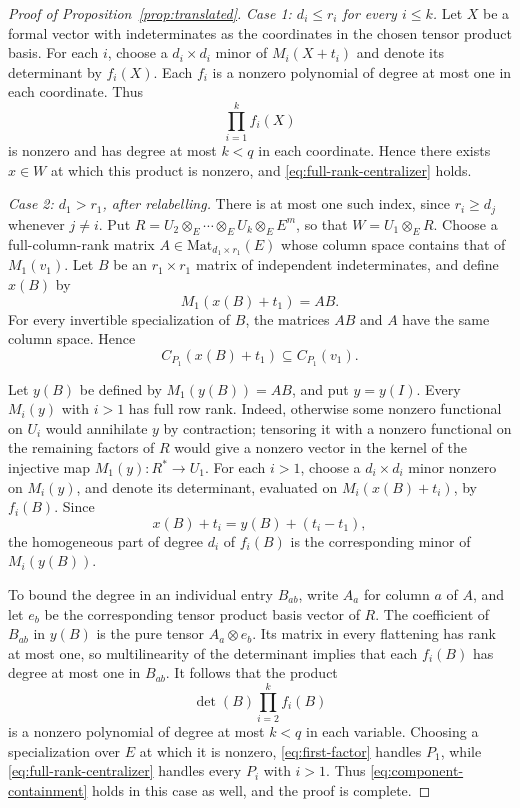 \documentclass[11pt]{amsart}
\numberwithin{equation}{section}
\theoremstyle{definition}
\theoremstyle{remark}
\begin{document}
\begin{proof}[Proof of Proposition~\ref{prop:translated}]
\smallskip
\noindent\emph{Case 1: $d_i \leqslant r_i$ for every $i \leqslant k$.}
Let $X$ be a formal vector with indeterminates as the coordinates in the chosen tensor product basis.
For each $i$, choose a $d_i \times d_i$ minor of $M_i(X+t_i)$ and denote its determinant by $f_i(X)$.
Each $f_i$ is a nonzero polynomial of degree at most one in each coordinate.
Thus
\[
    \prod_{i=1}^k f_i(X)
\]
is nonzero and has degree at most $k<q$ in each coordinate.
Hence there exists $x\in W$ at which this product is nonzero,
and \eqref{eq:full-rank-centralizer} holds.

\smallskip
\noindent\emph{Case 2: $d_1>r_1$, after relabelling.}
There is at most one such index, since $r_i \geqslant d_j$ whenever $j\ne i$.
Put $R=U_2\otimes_E\cdots\otimes_E U_k\otimes_E E^m$, so that $W=U_1\otimes_E R$.
Choose a full-column-rank matrix
$A\in\mathrm{Mat}_{d_1\times r_1}(E)$ whose column space contains that of
$M_1(v_1)$. Let $B$ be an $r_1\times r_1$ matrix of independent
indeterminates, and define $x(B)$ by
\[
    M_1(x(B)+t_1)=AB.
\]
For every invertible specialization of $B$, the matrices $AB$ and
$A$ have the same column space. Hence
\begin{equation}\label{eq:first-factor}
    C_{P_1}(x(B)+t_1) \subseteq C_{P_1}(v_1).
\end{equation}

Let $y(B)$ be defined by $M_1(y(B))=AB$, and put $y=y(I)$.
Every $M_i(y)$ with $i>1$ has full row rank.
Indeed, otherwise some nonzero functional on $U_i$ would annihilate $y$ by contraction;
tensoring it with a nonzero functional on the remaining factors of $R$
would give a nonzero vector in the kernel
of the injective map $M_1(y) \colon R^* \to U_1$.
For each $i>1$, choose a $d_i\times d_i$ minor nonzero on $M_i(y)$,
and denote its determinant, evaluated on $M_i(x(B)+t_i)$, by $f_i(B)$.
Since
\[
    x(B)+t_i=y(B)+(t_i-t_1),
\]
the homogeneous part of degree $d_i$ of $f_i(B)$ is the corresponding minor of $M_i(y(B))$.

To bound the degree in an individual entry $B_{ab}$, write $A_a$ for column $a$ of $A$,
and let $e_b$ be the corresponding tensor product basis vector of $R$.
The coefficient of $B_{ab}$ in $y(B)$ is the pure tensor $A_a\otimes e_b$.
Its matrix in every flattening has rank at most one, so multilinearity of the determinant implies that each \(f_i(B)\) has degree at most one in \(B_{ab}\).
It follows that the product
\[
    \det(B) \prod_{i=2}^k f_i(B)
\]
is a nonzero polynomial of degree at most $k<q$ in each variable.
Choosing a specialization over $E$ at which it is nonzero,
\eqref{eq:first-factor} handles $P_1$,
while \eqref{eq:full-rank-centralizer} handles every $P_i$ with $i>1$.
Thus \eqref{eq:component-containment} holds in this case as well,
and the proof is complete.
\end{proof}
\end{document}
